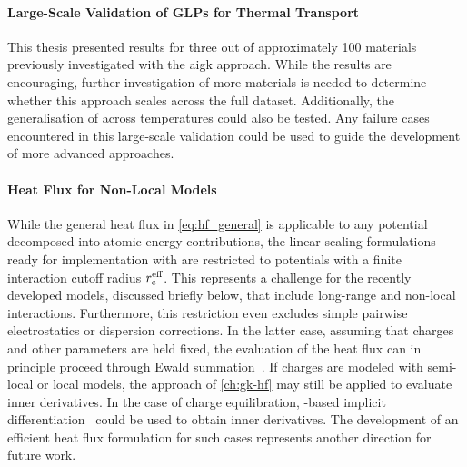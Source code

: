 \paragraph{Large-Scale Validation of GLPs for Thermal Transport}
This thesis presented results for three out of approximately \num{100} materials previously investigated with the \gls{aigk} approach.
While the results are encouraging, further investigation of more materials is needed to determine whether this approach scales across the full dataset.
Additionally, the generalisation of \mlps across temperatures could also be tested.
Any failure cases encountered in this large-scale validation could be used to guide the development of more advanced approaches.

\paragraph{Heat Flux for Non-Local Models}
While the general heat flux in \cref{eq:hf_general} is applicable to any potential decomposed into atomic energy contributions, the linear-scaling formulations ready for implementation with \ad are restricted to potentials with a finite interaction cutoff radius $r_{\text{c}}^{\text{eff}}$.
This represents a challenge for the recently developed models, discussed briefly below, that include long-range and non-local interactions. Furthermore, this restriction even excludes simple pairwise electrostatics or dispersion corrections.
In the latter case, assuming that charges and other parameters are held fixed, the evaluation of the heat flux can in principle proceed through Ewald summation~\cite{gce2004t}.
If charges are modeled with semi-local or local models, the approach of \cref{ch:gk-hf} may still be applied to evaluate inner derivatives.
In the case of charge equilibration, \ad-based implicit differentiation~\cite{bbpv2021m} could be used to obtain inner derivatives.
The development of an efficient heat flux formulation for such cases represents another direction for future work.

